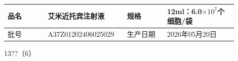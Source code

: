 \documentclass[UTF8,10pt,a4paper,fontset=fandol]{ctexart}
\newcommand{\fieldvalue}[1]{#1}
\newcommand{\handwritten}[1]{#1}
\begin{document}
\noindent
\begin{tabular}{|p{0.16\linewidth}|p{0.29\linewidth}|p{0.16\linewidth}|p{0.29\linewidth}|}
\hline
品名 &
\fieldvalue{艾米近托宾注射液} &
规格 &
\fieldvalue{12ml：6.0$\times 10^{7}$个细胞/袋}
\\
\hline
批号 &
\fieldvalue{A37Z01202406025029} &
生产日期 &
\fieldvalue{2026年05月20日}
\\
\hline
\end{tabular}

\vspace{2mm}

\handwritten{13??（6）}
\end{document}

